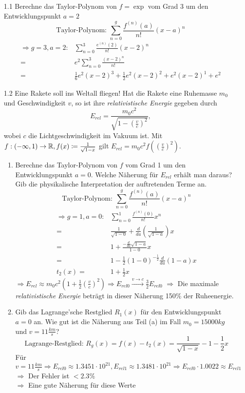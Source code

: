\documentclass{HM}
\begin{document}
	\begin{enumerate}
		\item[1.1] Berechne das Taylor-Polynom von $f=\exp$ vom Grad 3 um den Entwicklungspunkt $a=2$
		 $$\text{Taylor-Polynom: }\sum\limits_{n=0}^g\frac{f^{(n)}(a)}{n!}(x-a)^n$$
		 \begin{align*}
		 	\Rightarrow g=3, a=2: 
		 	&\sum\limits_{n=0}^3\frac{e^{(n)}(2)}{n!}(x-2)^n\\
		 	=&e^2\sum\limits_{n=0}^3\frac{(x-2)^n}{n!}\\
		 	=&\frac{1}{6}e^2(x-2)^3+\frac{1}{2}e^2(x-2)^2+e^2(x-2)^1+e^2
		 \end{align*}
		 
		 \item[1.2] Eine Rakete soll ins Weltall fliegen! Hat die Rakete eine Ruhemasse $m_0$ und Geschwindigkeit $v$, so ist ihre \textit{relativistische Energie} gegeben durch
		 $$E_{rel}=\frac{m_0c^2}{\sqrt{1-(\frac{v}{c})^2}},$$
		 wobei $c$ die Lichtgeschwindigkeit im Vakuum ist. Mit $f: (-\infty,1)\to\mathbb{R}, f(x)\coloneqq\frac{1}{\sqrt{1-x}}$ gilt $E_{rel}=m_0c^2f((\frac{v}{c})^2)$.
		 \begin{enumerate}
		 	\item Berechne das Taylor-Polynom von $f$ vom Grad 1 um den Entwicklungspunkt $a=0$. Welche Näherung für $E_{rel}$ erhält man daraus? Gib die physikalische Interpretation der auftretenden Terme an.
		 	$$\text{Taylor-Polynom: }\sum\limits_{n=0}^g\frac{f^{(n)}(a)}{n!}(x-a)^n$$
		 	\begin{align*}
		 		\Rightarrow g=1, a=0:
		 		&\sum\limits_{n=0}^1\frac{f^{(n)}(0)}{n!}x^n\\
		 		=&\frac{1}{\sqrt{1-0}}+\frac{d}{da}\left(\frac{1}{\sqrt{1-a}}\right)x\\
		 		=&1+\frac{-\frac{d}{da}\sqrt{1-a}}{1-0}x\\
		 		=&1-\frac{1}{2}(1-0)^{-\frac{1}{2}}\frac{d}{da}(1-a)x\\
		 		t_2(x)=&1+\frac{1}{2}x
			\end{align*}
			$\Rightarrow E_{rel}\approx m_0c^2(1+\frac{1}{2}(\frac{v}{c})^2) \Rightarrow E_{rel0}\xrightarrow{v\to c}\frac{3}{2}E_{rel0}$
			$\Rightarrow$ Die maximale \textit{relativistische Energie} beträgt in dieser Näherung 150\% der Ruheenergie.
		 	
		 	\item Gib das Lagrange'sche Restglied $R_1(x)$ für den Entwicklungspunkt $a=0$ an. Wie gut ist die Näherung aus Teil (a) im Fall $m_0=15000kg$ und $v=11\frac{km}{s}$?
		 	$$\text{Lagrange-Restglied: }R_g(x)=f(x)-t_2(x)=\frac{1}{\sqrt{1-x}}-1-\frac{1}{2}x$$
		 	Für $v=11\frac{km}{s}\Rightarrow E_{rel0}\approx 1.3451\cdot 10^{21}, E_{rel1}\approx 1.3481\cdot 10^{21}\Rightarrow E_{rel0}\cdot 1.0022\approx E_{rel1}$\\
		 	$\Rightarrow$ Der Fehler ist $<2.3\%$\\
		 	$\Rightarrow$ Eine gute Näherung für diese Werte\\
		 	

\end{enumerate}
\end{enumerate}
\end{document}
